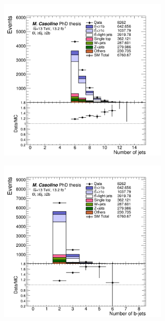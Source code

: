 \begin{figure}[p]
\begin{subfigure}{0.33\textwidth}
  \centering
  \includegraphics[width=0.9\textwidth]{figures/VLQ/presel/0lep/canv_c0l2b_jets_n.png}
  \caption{}
  \label{}
\end{subfigure}
\begin{subfigure}{0.33\textwidth}
  \centering
  \includegraphics[width=0.9\textwidth]{figures/VLQ/presel/0lep/canv_c0l2b_bjets_n.png}

\end{subfigure}
\end{figure}
